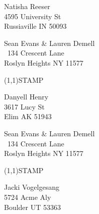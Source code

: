 \documentclass[12pt]{article}
\begin{document}
\begin{center} \begin{Huge} \vspace*{\fill}
Natisha Reeser\\
4595 University St\\
Russiaville IN 50093\\
\vspace{\fill} \end{Huge} \end{center}

\clearpage

\begin{minipage}{.5\linewidth} \noindent
Sean Evans \& Lauren Demell\\\ 
134 Crescent Lane\\ 
Roslyn Heights NY 11577
\end{minipage}
\begin{minipage}{.5\linewidth \hspace{-.2in} \vspace{-.3in}}
\begin{flushright}
\framebox(1,1){STAMP}
\end{flushright}
\end{minipage}

\begin{center} \begin{Huge} \vspace*{\fill}
Danyell Henry\\
3617 Lucy St\\
Elim AK 51943\\
\vspace{\fill} \end{Huge} \end{center}

\clearpage

\begin{minipage}{.5\linewidth} \noindent
Sean Evans \& Lauren Demell\\\ 
134 Crescent Lane\\ 
Roslyn Heights NY 11577
\end{minipage}
\begin{minipage}{.5\linewidth \hspace{-.2in} \vspace{-.3in}}
\begin{flushright}
\framebox(1,1){STAMP}
\end{flushright}
\end{minipage}

\begin{center} \begin{Huge} \vspace*{\fill}
Jacki Vogelgesang\\
5724 Acme Aly\\
Boulder UT 53363\\
\vspace{\fill} \end{Huge} \end{center}
\end{document}
